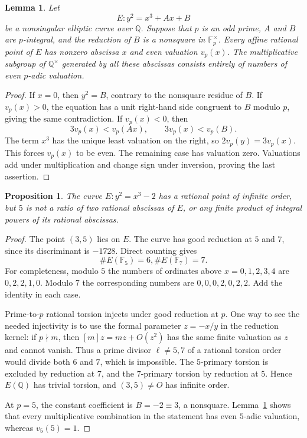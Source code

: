 \documentclass[11pt,a4paper]{article}
\newtheorem{proposition}[theorem]{Proposition}
\newtheorem{lemma}[theorem]{Lemma}
\theoremstyle{definition}
\newcommand{\Q}{\mathbb Q}
\begin{document}
\begin{lemma}\label{lem:abscissa-parity}
Let
\[
                       E:y^2=x^3+Ax+B
\]
be a nonsingular elliptic curve over $\Q$. Suppose that $p$ is
an odd prime, $A$ and $B$ are $p$-integral, and the reduction
of $B$ is a nonsquare in $\mathbb F_p^\times$.
Every affine rational point of $E$ has nonzero abscissa $x$
and even valuation $v_p(x)$. The multiplicative subgroup of
$\Q^\times$ generated by all these abscissas consists entirely
of numbers of even $p$-adic valuation.
\end{lemma}
\begin{proof}
If $x=0$, then $y^2=B$, contrary to the nonsquare residue of
$B$. If $v_p(x)>0$, the equation has a unit right-hand side
congruent to $B$ modulo $p$, giving the same contradiction.
If $v_p(x)<0$, then
\[
        3v_p(x)<v_p(Ax),\qquad 3v_p(x)<v_p(B).
\]
The term $x^3$ has the unique least valuation on the right,
so $2v_p(y)=3v_p(x)$. This forces $v_p(x)$ to be even.
The remaining case has valuation zero. Valuations add under
multiplication and change sign under inversion, proving the
last assertion.
\end{proof}

\begin{proposition}\label{prop:abscissa-example}
The curve $E:y^2=x^3-2$ has a rational point of infinite order,
but $5$ is not a ratio of two rational abscissas of $E$, or
any finite product of integral powers of its rational abscissas.
\end{proposition}
\begin{proof}
The point $(3,5)$ lies on $E$. The curve has good reduction at
$5$ and $7$, since its discriminant is $-1728$. Direct counting
gives
\[
                       \#E(\mathbb F_5)=6,
                       \#E(\mathbb F_7)=7.
\]
For completeness, modulo $5$ the numbers of ordinates above
$x=0,1,2,3,4$ are $0,2,2,1,0$. Modulo $7$ the corresponding
numbers are $0,0,0,2,0,2,2$. Add the identity in each case.

Prime-to-$p$ rational torsion injects under good reduction at
$p$. One way to see the needed injectivity is to use the formal
parameter $z=-x/y$ in the reduction kernel: if $p\nmid m$,
then $[m]z=mz+O(z^2)$ has the same finite valuation as $z$ and
cannot vanish. Thus a prime divisor $\ell\ne5,7$ of a rational
torsion order would divide both $6$ and $7$, which is impossible.
The $5$-primary torsion is excluded by reduction at $7$, and
the $7$-primary torsion by reduction at $5$. Hence $E(\Q)$
has trivial torsion, and $(3,5)\ne O$ has infinite order.

At $p=5$, the constant coefficient is $B=-2\equiv3$, a
nonsquare. Lemma~\ref{lem:abscissa-parity} shows that every
multiplicative combination in the statement has even
$5$-adic valuation, whereas $v_5(5)=1$.
\end{proof}
\end{document}
